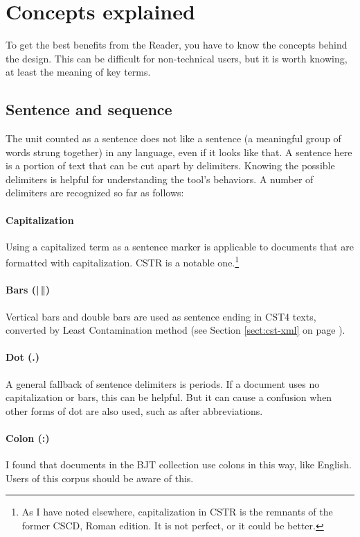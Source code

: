\section{Concepts explained}

To get the best benefits from the Reader, you have to know the concepts behind the design. This can be difficult for non-technical users, but it is worth knowing, at least the meaning of key terms.

\subsection{Sentence and sequence}

The unit counted as a sentence does not like a sentence (a meaningful group of words strung together) in any language, even if it looks like that. A sentence here is a portion of text that can be cut apart by delimiters. Knowing the possible delimiters is helpful for understanding the tool's behaviors. A number of delimiters are recognized so far as follows:

\paragraph{Capitalization} Using a capitalized term as a sentence marker is applicable to documents that are formatted with capitalization. CSTR is a notable one.\footnote{As I have noted elsewhere, capitalization in CSTR is the remnants of the former CSCD, Roman edition. It is not perfect, or it could be better.}

\paragraph{Bars (|\,‖)} Vertical bars and double bars are used as sentence ending in CST4 texts, converted by Least Contamination method (see Section \ref{sect:cst-xml} on page \pageref{sect:cst-xml}).

\paragraph{Dot (.)} A general fallback of sentence delimiters is periods. If a document uses no capitalization or bars, this can be helpful. But it can cause a confusion when other forms of dot are also used, such as after abbreviations.

\paragraph{Colon (:)} I found that documents in the BJT collection use colons in this way, like English. Users of this corpus should be aware of this.

